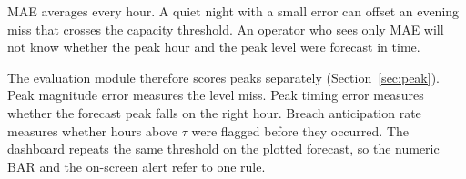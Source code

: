 MAE averages every hour. A quiet night with a small error can offset an
evening miss that crosses the capacity threshold. An operator who sees only
MAE will not know whether the peak hour and the peak level were forecast in
time.

The evaluation module therefore scores peaks separately
(Section~\ref{sec:peak}). Peak magnitude error measures the level miss.
Peak timing error measures whether the forecast peak falls on the right hour.
Breach anticipation rate measures whether hours above \(\tau\) were flagged
before they occurred. The dashboard repeats the same threshold on the plotted
forecast, so the numeric BAR and the on-screen alert refer to one rule.

